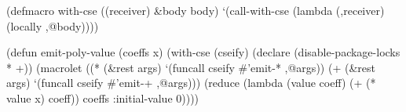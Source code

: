 \documentclass[svgnames,11pt]{article}
\begin{document}
(defmacro with-cse ((receiver) \&body body)
  `(call-with-cse
    (lambda (,receiver)
      (locally ,@body))))

(defun emit-poly-value (coeffs x)
  (with-cse (cseify)
    (declare (disable-package-locks * +))
    (macrolet ((* (\&rest args)
                 `(funcall cseify \#'emit-* ,@args))
               (+ (\&rest args)
                 `(funcall cseify \#'emit-+ ,@args)))
      (reduce (lambda (value coeff)
                (+ (* value x) coeff)) 
              coeffs
              :initial-value 0))))
\end{document}
